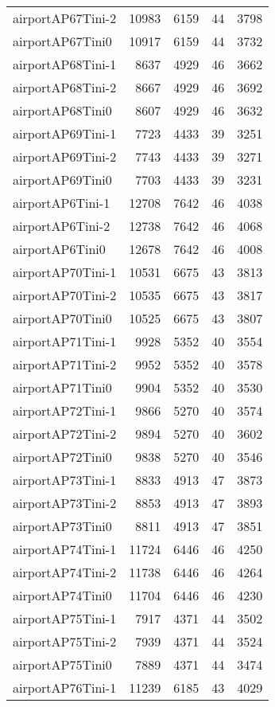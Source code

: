 \begin{longtable}{lrrrr}
airportAP67Tini-2 & 10983 & 6159 & 44 & 3798 \\
airportAP67Tini0 & 10917 & 6159 & 44 & 3732 \\
airportAP68Tini-1 & 8637 & 4929 & 46 & 3662 \\
airportAP68Tini-2 & 8667 & 4929 & 46 & 3692 \\
airportAP68Tini0 & 8607 & 4929 & 46 & 3632 \\
airportAP69Tini-1 & 7723 & 4433 & 39 & 3251 \\
airportAP69Tini-2 & 7743 & 4433 & 39 & 3271 \\
airportAP69Tini0 & 7703 & 4433 & 39 & 3231 \\
airportAP6Tini-1 & 12708 & 7642 & 46 & 4038 \\
airportAP6Tini-2 & 12738 & 7642 & 46 & 4068 \\
airportAP6Tini0 & 12678 & 7642 & 46 & 4008 \\
airportAP70Tini-1 & 10531 & 6675 & 43 & 3813 \\
airportAP70Tini-2 & 10535 & 6675 & 43 & 3817 \\
airportAP70Tini0 & 10525 & 6675 & 43 & 3807 \\
airportAP71Tini-1 & 9928 & 5352 & 40 & 3554 \\
airportAP71Tini-2 & 9952 & 5352 & 40 & 3578 \\
airportAP71Tini0 & 9904 & 5352 & 40 & 3530 \\
airportAP72Tini-1 & 9866 & 5270 & 40 & 3574 \\
airportAP72Tini-2 & 9894 & 5270 & 40 & 3602 \\
airportAP72Tini0 & 9838 & 5270 & 40 & 3546 \\
airportAP73Tini-1 & 8833 & 4913 & 47 & 3873 \\
airportAP73Tini-2 & 8853 & 4913 & 47 & 3893 \\
airportAP73Tini0 & 8811 & 4913 & 47 & 3851 \\
airportAP74Tini-1 & 11724 & 6446 & 46 & 4250 \\
airportAP74Tini-2 & 11738 & 6446 & 46 & 4264 \\
airportAP74Tini0 & 11704 & 6446 & 46 & 4230 \\
airportAP75Tini-1 & 7917 & 4371 & 44 & 3502 \\
airportAP75Tini-2 & 7939 & 4371 & 44 & 3524 \\
airportAP75Tini0 & 7889 & 4371 & 44 & 3474 \\
airportAP76Tini-1 & 11239 & 6185 & 43 & 4029 \\

\end{longtable}
